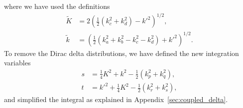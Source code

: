 \documentclass[a4paper,12pt]{report}
\begin{document}
where we have used the definitions
\begin{align}
  \tilde{K} &= 2\left( \frac{1}{2}\left( k_{c}^{2}+k_{d}^{2}\right) 
  - k'^{2}\right)^{1/2}, \nonumber \\
  \tilde{k}&=\left( \frac{1}{2}\left( k_{a}^{2}+k_{b}^{2}
  -k_{c}^{2}-k_{d}^{2} \right) + k'^{2} \right)^{1/2}.
\end{align}
To remove the Dirac delta distributions, 
we have defined the new integration variables
\begin{align}
  s &= \frac{1}{4}K^{2}+k^{2}-\frac{1}{2}
  \left( k_{p}^{2}+k_{q}^{2}\right), \nonumber \\
  t &= k'^{2}+\frac{1}{4}K^{2}-\frac{1}{2}
  \left( k_{r}^{2}+k_{s}^{2}\right),
\end{align}
and simplified the integral as explained in 
Appendix~\ref{sec:coupled_delta}.
\end{document}
